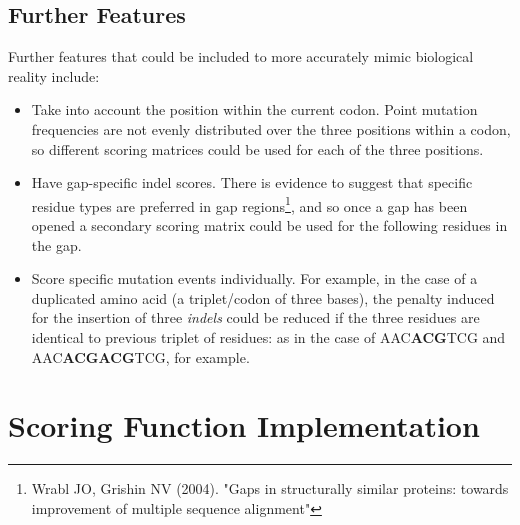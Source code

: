 \documentclass[a4paper]{article}
\begin{document}
\subsection{Further Features}
Further features that could be included to more accurately mimic biological reality include:
\begin{itemize}
\item Take into account the position within the current codon. Point mutation frequencies are not evenly distributed over the three positions within a codon, so different scoring matrices could be used for each of the three positions.
\item Have gap-specific indel scores. There is evidence to suggest that specific residue types are preferred in gap regions\footnote{Wrabl JO, Grishin NV (2004). "Gaps in structurally similar proteins: towards improvement of multiple sequence alignment" }, and so once a gap has been opened a secondary scoring matrix could be used for the following residues in the gap.
\item Score specific mutation events individually. For example, in the case of a duplicated amino acid (a triplet/codon of three bases), the penalty induced for the insertion of three \textit{indels} could be reduced if the three residues are identical to previous triplet of residues: as in the case of AAC\textbf{ACG}TCG and AAC\textbf{ACGACG}TCG, for example. 

\end{itemize}
\section{Scoring Function Implementation}
\end{document}
